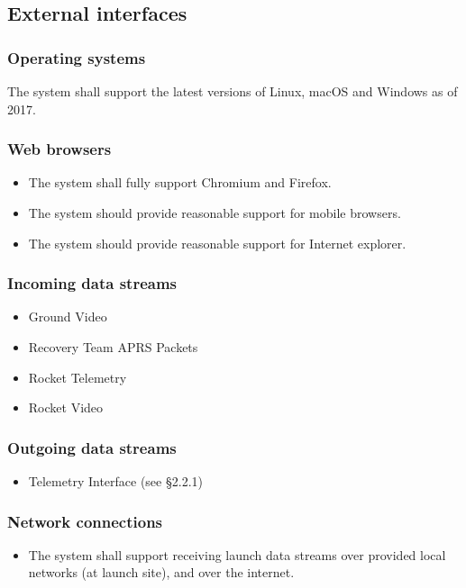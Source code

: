 \subsection{External interfaces}

\subsubsection{Operating systems}
  The system shall support the latest versions of Linux, macOS and Windows as of 2017.

\subsubsection{Web browsers}
  \begin{itemize}
    \item The system shall fully support Chromium and Firefox.
    \item The system should provide reasonable support for mobile browsers.
    \item The system should provide reasonable support for Internet explorer.
  \end{itemize}

\subsubsection{Incoming data streams}
  \begin{itemize}
    \item Ground Video
    \item Recovery Team APRS Packets
    \item Rocket Telemetry
    \item Rocket Video
  \end{itemize}

\subsubsection{Outgoing data streams}
  \begin{itemize}
    \item Telemetry Interface (see \S 2.2.1)
  \end{itemize}

\subsubsection{Network connections}
  \begin{itemize}
    \item The system shall support receiving launch data streams over provided local networks (at launch site), and over the internet.
  \end{itemize}
